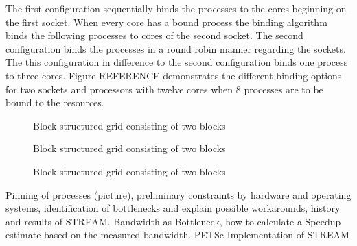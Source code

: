 The first configuration sequentially binds the processes to the cores beginning on the first socket. When every core has a bound process the binding algorithm binds the following processes to cores of the second socket. The second configuration binds the processes in a round robin manner regarding the sockets. The this configuration in difference to the second configuration binds one process to three cores. Figure REFERENCE demonstrates the different binding options for two sockets and processors with twelve cores when 8 processes are to be bound to the resources.

\begin{figure}[h]
  \centering
  \label{fig:blockstruc}
    
    \centering{}
  \caption{Block structured grid consisting of two blocks}
\end{figure}

\begin{figure}[h]
  \centering
  \label{fig:blockstruc}
    
    \centering{}
  \caption{Block structured grid consisting of two blocks}
\end{figure}

\begin{figure}[h]
  \centering
  \label{fig:blockstruc}
    
    \centering{}
  \caption{Block structured grid consisting of two blocks}
\end{figure}

        Pinning of processes (picture), preliminary constraints by hardware and operating systems, identification of bottlenecks and explain possible workarounds, history and results of STREAM. Bandwidth as Bottleneck, how to calculate a Speedup estimate based on the measured bandwidth. PETSc Implementation of STREAM

